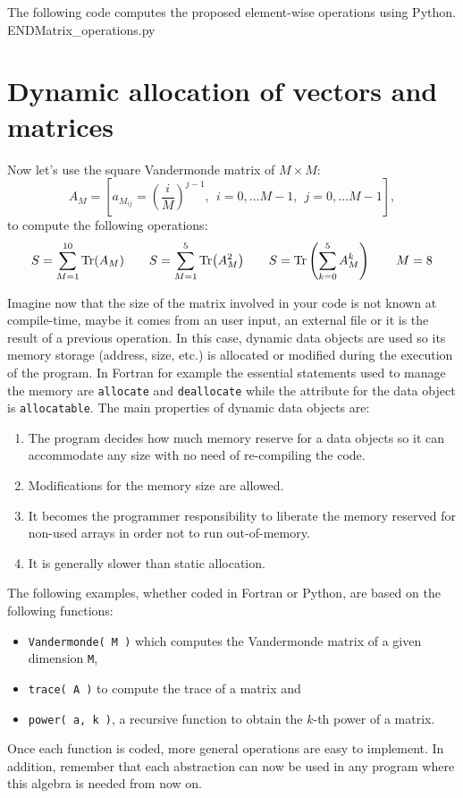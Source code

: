 The following code computes the proposed element-wise operations using Python.
\vspace{-.5cm}
\lstpython
{}
{END}{Matrix_operations.py}





\newpage  
\section{Dynamic allocation of vectors and matrices} 

Now let's use the square Vandermonde matrix  of $M\times M$:
$$
A_M =  \left[ a_{ M_{ij} } = \left( \frac{i}{M} \right)^{j-1}, \ \ i = 0, \ldots M-1, \ \  j=0, \ldots M-1 \right],  
$$
to compute the following operations:
$$ 
S = \sum_{M=1} ^{10} \Tr(A_M)  \qquad
S = \sum_{M=1} ^{5} \Tr(A_M^2) \qquad
S = \Tr \left( \sum_{k=0} ^{5} A_M^k  \right)  \qquad  M=8 
$$

Imagine now that the size of the matrix involved in your code is not known at compile-time, maybe it comes from 
an user input, 
an external file or 
it is the result of a previous operation. 
In this case, dynamic data objects are used so its memory storage (address, size, etc.) is allocated or modified during the execution of the program.
In Fortran for example the essential statements used to manage the memory are 
\texttt{allocate} and \texttt{deallocate} while the attribute for the data object is \texttt{allocatable}. 
The main properties of dynamic data objects are:

\begin{enumerate}
    \item The program decides how much memory reserve for a data objects so it can accommodate any size with no need of re-compiling the code.
    \item Modifications for the memory size are allowed. 
    \item It becomes the programmer responsibility to liberate the memory reserved for non-used arrays in order not to run out-of-memory.
    \item It is generally slower than static allocation. 
\end{enumerate}

The following examples, whether coded in Fortran or Python, are based on the following functions: 
\begin{itemize}[noitemsep]
    \item \texttt{Vandermonde( M )} which computes the Vandermonde matrix of a given dimension \texttt{M},
    \item \texttt{trace( A )} to compute the trace of a matrix and
    \item \texttt{power( a, k )}, a recursive function to obtain the $k$-th power of a matrix.
\end{itemize}
Once each function is coded, more general operations are easy to implement. 
In addition, remember that each abstraction can now be used in any program where this algebra is needed from now on. 




